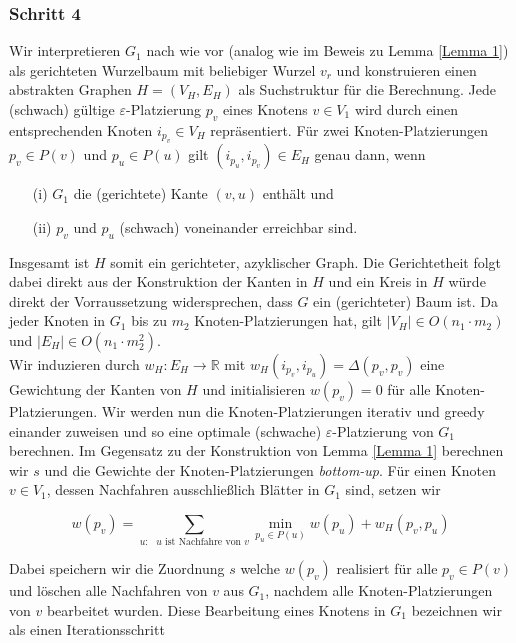 \documentclass[a4paper, 12pt, twoside]{article}
\theoremstyle{Format1} %
\begin{document}
\subsubsection{Schritt 4}
Wir interpretieren $G_1$ nach wie vor (analog wie im Beweis zu Lemma \ref{Lemma 1}) als gerichteten Wurzelbaum  mit beliebiger Wurzel $v_r$ und
konstruieren einen abstrakten Graphen $H = (V_H, E_H)$ als Suchstruktur für die Berechnung.
Jede (schwach) gültige $\varepsilon$-Platzierung $p_v$ eines Knotens $v \in V_1$ wird durch einen entsprechenden Knoten $i_{p_v} \in V_H$ repräsentiert.
Für zwei Knoten-Platzierungen $p_v \in P(v)$ und $p_u \in P(u)$ gilt $(i_{p_u},i_{p_v}) \in E_H$ genau dann, wenn

\begin{enumerate}
	\item[(i)] $G_1$ die (gerichtete) Kante $(v,u)$ enthält und
	\item[(ii)] $p_v$ und $p_u$ (schwach) voneinander erreichbar sind.
\end{enumerate}

Insgesamt ist $H$ somit ein gerichteter, azyklischer Graph. Die Gerichtetheit folgt dabei direkt aus der Konstruktion der Kanten in $H$ und
ein Kreis in $H$ würde direkt der Vorraussetzung widersprechen, dass $G$ ein (gerichteter) Baum ist.
Da jeder Knoten in $G_1$ bis zu $m_2$ Knoten-Platzierungen hat, gilt $|V_H| \in O(n_1 \cdot m_2)$ und $|E_H| \in O(n_1 \cdot m_2^2)$.
\\
Wir induzieren durch $w_H: E_H \to \mathbb{R}$ mit $w_H(i_{p_v},i_{p_u}) = \Delta(p_v,p_v)$ eine Gewichtung der Kanten von $H$ und
initialisieren $w(p_v) = 0$ für alle Knoten-Platzierungen.
Wir werden nun die Knoten-Platzierungen iterativ und greedy einander zuweisen und so eine optimale (schwache) $\varepsilon$-Platzierung von $G_1$ berechnen.
Im Gegensatz zu der Konstruktion von Lemma \ref{Lemma 1} berechnen wir $s$ und die Gewichte der Knoten-Platzierungen \textit{bottom-up}.
Für einen Knoten $v \in V_1$, dessen Nachfahren ausschließlich Blätter in $G_1$ sind, setzen wir

\begin{equation}
	w(p_v) = \sum_{\text{$u:$ $u$ ist Nachfahre von $v$}} \min_{p_u \in P(u)} w(p_u) + w_H(p_v,p_u) \label{optimal placements}
\end{equation}

Dabei speichern wir die Zuordnung $s$ welche $w(p_v)$ realisiert für alle $p_v \in P(v)$ und löschen alle Nachfahren von $v$ aus $G_1$,
nachdem alle Knoten-Platzierungen von $v$ bearbeitet wurden.
Diese Bearbeitung eines Knotens in $G_1$ bezeichnen wir als einen Iterationsschritt \label{Iterationsschritt}
\end{document}
